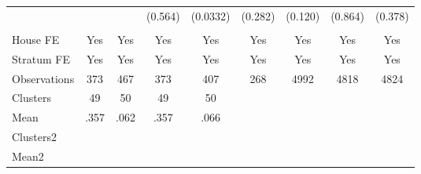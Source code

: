 {\begin{tabular}{l*{8}{c}}
                &         &         &  (0.564)& (0.0332)&  (0.282)&  (0.120)&  (0.864)&  (0.378)\\
                &         &         &         &         &         &         &         &         \\
House FE        &      Yes&      Yes&      Yes&      Yes&      Yes&      Yes&      Yes&      Yes\\
Stratum FE      &      Yes&      Yes&      Yes&      Yes&      Yes&      Yes&      Yes&      Yes\\
\midrule
Observations    &      373&      467&      373&      407&      268&     4992&     4818&     4824\\
Clusters        &       49&       50&       49&       50&         &         &         &         \\
Mean            &     .357&     .062&     .357&     .066&         &         &         &         \\
Clusters2       &         &         &         &         &         &         &         &         \\
Mean2           &         &         &         &         &         &         &         &         \\
\bottomrule
\end{tabular}
}
